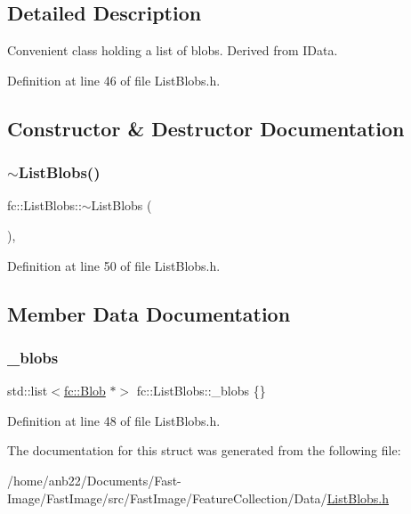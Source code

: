 \subsection{Detailed Description}
Convenient class holding a list of blobs. Derived from I\+Data. 

Definition at line 46 of file List\+Blobs.\+h.



\subsection{Constructor \& Destructor Documentation}
\mbox{\label{structfc_1_1ListBlobs_a00652d45fadd4f508e7705200d72a203}} 
\subsubsection{\texorpdfstring{$\sim$\+List\+Blobs()}{~ListBlobs()}}
{\footnotesize\ttfamily fc\+::\+List\+Blobs\+::$\sim$\+List\+Blobs (\begin{DoxyParamCaption}{ }\end{DoxyParamCaption})\hspace{0.3cm}{\ttfamily [inline]}, {\ttfamily [override]}}



Definition at line 50 of file List\+Blobs.\+h.



\subsection{Member Data Documentation}
\mbox{\label{structfc_1_1ListBlobs_a1de7fecc65a29e085a549aecac224e52}} 
\subsubsection{\texorpdfstring{\+\_\+blobs}{\_blobs}}
{\footnotesize\ttfamily std\+::list$<$\hyperlink{classfc_1_1Blob}{fc\+::\+Blob} $\ast$$>$ fc\+::\+List\+Blobs\+::\+\_\+blobs \{\}}



Definition at line 48 of file List\+Blobs.\+h.



The documentation for this struct was generated from the following file\+:\begin{DoxyCompactItemize}
\item 
/home/anb22/\+Documents/\+Fast-\/\+Image/\+Fast\+Image/src/\+Fast\+Image/\+Feature\+Collection/\+Data/\hyperlink{ListBlobs_8h}{List\+Blobs.\+h}\end{DoxyCompactItemize}
